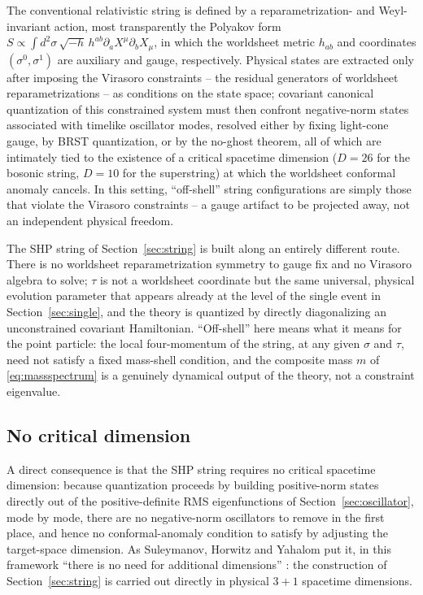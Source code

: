 \documentclass[11pt]{article}
\begin{document}
The conventional relativistic string is defined by a reparametrization- and
Weyl-invariant action, most transparently the Polyakov form
$S\propto\int d^2\sigma\,\sqrt{-h}\,h^{ab}\partial_a X^\mu\partial_b X_\mu$,
in which the worldsheet metric $h_{ab}$ and coordinates $(\sigma^0,\sigma^1)$
are auxiliary and gauge, respectively. Physical states are extracted only
after imposing the Virasoro constraints -- the residual generators of
worldsheet reparametrizations -- as conditions on the state space; covariant
canonical quantization of this constrained system must then confront negative-norm
states associated with timelike oscillator modes, resolved either by fixing
light-cone gauge, by BRST quantization, or by the no-ghost theorem, all of
which are intimately tied to the existence of a critical spacetime dimension
($D=26$ for the bosonic string, $D=10$ for the superstring) at which the
worldsheet conformal anomaly cancels. In this setting, ``off-shell'' string
configurations are simply those that violate the Virasoro constraints -- a
gauge artifact to be projected away, not an independent physical freedom.

The SHP string of Section~\ref{sec:string} is built along an entirely
different route. There is no worldsheet reparametrization symmetry to gauge
fix and no Virasoro algebra to solve; $\tau$ is not a worldsheet coordinate
but the same universal, physical evolution parameter that appears already at
the level of the single event in Section~\ref{sec:single}, and the theory is
quantized by directly diagonalizing an unconstrained covariant Hamiltonian.
``Off-shell'' here means what it means for the point particle: the local
four-momentum of the string, at any given $\sigma$ and $\tau$, need not satisfy
a fixed mass-shell condition, and the composite mass $m$ of
\eqref{eq:massspectrum} is a genuinely dynamical output of the theory, not a
constraint eigenvalue.

\subsection{No critical dimension}

A direct consequence is that the SHP string requires no critical spacetime
dimension: because quantization proceeds by building positive-norm states
directly out of the positive-definite RMS eigenfunctions of
Section~\ref{sec:oscillator}, mode by mode, there are no negative-norm
oscillators to remove in the first place, and hence no conformal-anomaly
condition to satisfy by adjusting the target-space dimension. As Suleymanov,
Horwitz and Yahalom put it, in this framework ``there is no need for
additional dimensions'' \cite{SuleymanovHorwitzYahalom2017}: the construction
of Section~\ref{sec:string} is carried out directly in physical $3+1$
spacetime dimensions.
\end{document}

